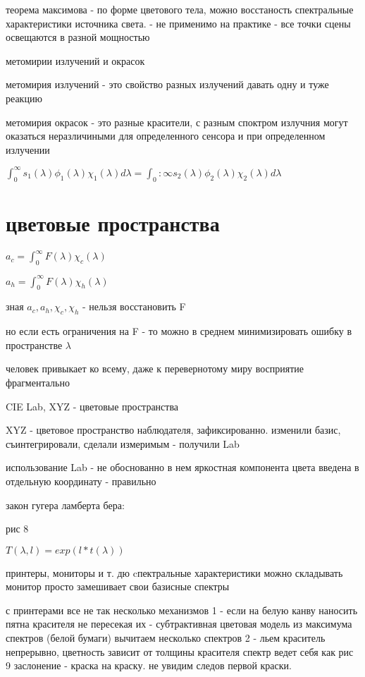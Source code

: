 \documentclass[]{report}
\begin{document}
теорема максимова - по форме цветового тела, можно восстаность спектральные характеристики источника света. - не применимо на практике - все точки сцены освещаются в разной мощностью


метомирии излучений и окрасок

метомирия излучений - это свойство разных излучений давать одну и туже реакцию

метомирия окрасок - это разные красители, с разным споктром излучния могут оказаться неразличиными для определенного сенсора и при определенном излучении

$\int_0^\infty s_1(\lambda)\phi_1(\lambda)\chi_1(\lambda)d\lambda = \int_0:\infty s_2(\lambda)\phi_2(\lambda)\chi_2(\lambda)d \lambda$


\section{цветовые пространства}


$a_c = \int_0^\infty F(\lambda)\chi_c(\lambda)$

$a_h = \int_0^\infty F(\lambda)\chi_h(\lambda)$

зная $a_c, a_h, \chi_c, \chi_h$ - нельзя восстановить F

но если есть ограничения на F - то можно в среднем минимизировать ошибку в пространстве $\lambda$


человек привыкает ко всему, даже к перевернотому миру
восприятие фрагментально


CIE Lab, XYZ - цветовые пространства

XYZ - цветовое пространство наблюдателя, зафиксированно.
изменили базис, съинтегрировали, сделали измеримым - получили Lab

использование Lab - не обоснованно
в нем яркостная компонента цвета введена в отдельную координату - правильно

закон гугера ламберта бера:

рис 8

$T(\lambda, l) = exp(l*t(\lambda))$


принтеры, мониторы и т. дю
cпектральные характеристики можно складывать
монитор просто замешивает свои базисные спектры

с принтерами все не так
несколько механизмов
1 - если на белую канву наносить пятна красителя не пересекая их - субтрактивная цветовая модель
из максимума спектров (белой бумаги) вычитаем несколько спектров
2 - льем краситель непрерывно, цветность зависит от толщины красителя
спектр ведет себя как рис 9
заслонение - краска на краску. не увидим следов первой краски.
\end{document}
